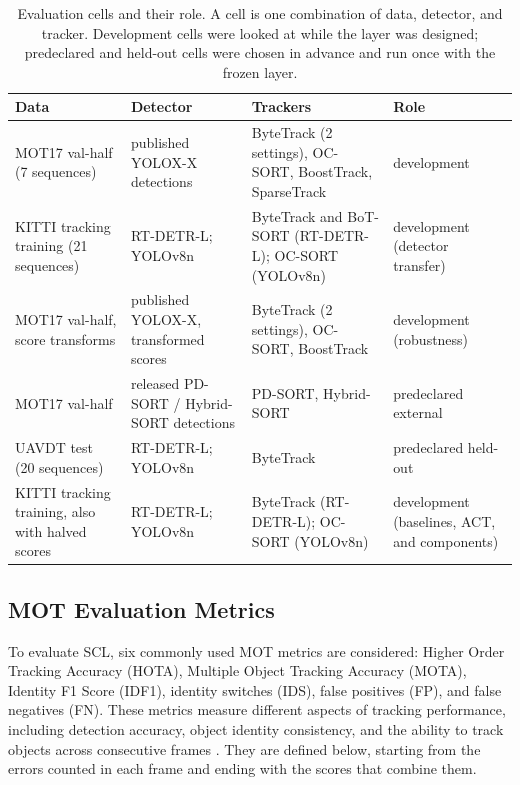 \documentclass[pdflatex,sn-mathphys-num,iicol]{sn-jnl}
\newcommand{\scl}{SCL}
\begin{document}
\begin{table}[t]
\caption{Evaluation cells and their role. A cell is one combination of data,
detector, and tracker. Development cells were looked at while the layer was
designed; predeclared and held-out cells were chosen in advance and run once
with the frozen layer.}
\label{tab:data}
\centering\footnotesize
\setlength{\tabcolsep}{4pt}
\begin{tabular}{@{}>{\raggedright\arraybackslash}p{29mm}>{\raggedright\arraybackslash}p{25mm}>{\raggedright\arraybackslash}p{42mm}>{\raggedright\arraybackslash}p{25mm}@{}}
\toprule
Data & Detector & Trackers & Role\\
\midrule
MOT17 val-half (7 sequences) & published YOLOX-X detections & ByteTrack (2 settings), OC-SORT, BoostTrack, SparseTrack & development\\
KITTI tracking training (21 sequences) & RT-DETR-L; YOLOv8n & ByteTrack and BoT-SORT (RT-DETR-L); OC-SORT (YOLOv8n) & development (detector transfer)\\
MOT17 val-half, score transforms & published YOLOX-X, transformed scores & ByteTrack (2 settings), OC-SORT, BoostTrack & development (robustness)\\
MOT17 val-half & released PD-SORT / Hybrid-SORT detections & PD-SORT, Hybrid-SORT & predeclared external\\
UAVDT test (20 sequences) & RT-DETR-L; YOLOv8n & ByteTrack & predeclared held-out\\
KITTI tracking training, also with halved scores & RT-DETR-L; YOLOv8n & ByteTrack (RT-DETR-L); OC-SORT (YOLOv8n) & development (baselines, ACT, and components)\\
\bottomrule
\end{tabular}
\end{table}

\subsection{MOT Evaluation Metrics}\label{sec:metrics}
To evaluate \scl{}, six commonly used MOT metrics are considered: Higher Order Tracking Accuracy
(HOTA), Multiple Object Tracking Accuracy (MOTA), Identity F1 Score (IDF1), identity switches
(IDS), false positives (FP), and false negatives (FN). These metrics measure different aspects of
tracking performance, including detection accuracy, object identity consistency, and the ability to
track objects across consecutive frames \cite{dendorfer2021motchallenge,luiten2021hota}. They are
defined below, starting from the errors counted in each frame and ending with the scores that
combine them.
\end{document}
